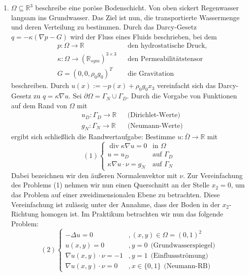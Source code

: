\documentclass[12pt,a4paper]{scrartcl}
\newcommand{\R}{\mathbb{R}}
\DeclareMathOperator{\dive}{div}
\numberwithin{equation}{section}
\begin{document}
\begin{enumerate}[label=(\roman*)]
\item  $ \Omega \subseteq \R^3 $  beschreibe eine poröse Bodenschicht. Von oben sickert Regenwasser langsam ins Grundwasser. Das Ziel ist nun, die transportierte Wassermenge und deren Verteilung zu bestimmen.
\newline Durch das Darcy-Gesetz $ q= -\kappa(\nabla p - G)$ wird der Fluss eines Fluids beschrieben, bei dem 
\begin{align*}& p:\Omega \rightarrow \R &&\text{den hydrostatische Druck,}\\
&  \kappa : \Omega \rightarrow (\R_{sym})^{3\times3}  &&\text{den Permeabilitätstensor}\\
& G = (0,0,\rho_0 g_0)^T &&\text{die Gravitation}
\end{align*} beschreiben. Durch $u(x):=-p(x)+\rho_0 g_0 x_3$ vereinfacht sich das Darcy-Gesetz zu $q=\kappa\nabla u$.
\newline Sei $\partial \Omega = \Gamma_N \cup \Gamma_D$. Durch die Vorgabe von Funktionen auf dem Rand von $\Omega$ mit
\begin{align*}&u_D: \Gamma_D \rightarrow \R &&\text{(Dirichlet-Werte)}\\
& g_N: \Gamma_N \rightarrow \R &&\text{(Neumann-Werte)}
\end{align*} ergibt sich schließlich die Randwertaufgabe: Bestimme $u:\bar{\Omega} \rightarrow \R$ mit
\[(1)\begin{cases}
\dive \kappa \nabla u = 0 &\text{in $\Omega$}\\
u = u_D  &\text{auf $\Gamma_D$}\\
\kappa \nabla u \cdot \nu = g_N &\text{auf $\Gamma_N$}
\end{cases}
\]
Dabei bezeichnen wir den äußeren Normalenvektor mit $\nu$.
\newline Zur Vereinfachung des Problems (1) nehmen wir nun einen Querschnitt an der Stelle $x_2 = 0$, um das Problem auf einer zweidimensionalen Ebene zu betrachten. Diese Vereinfachung ist zulässig unter der Annahme, dass der Boden in der $x_2$-Richtung homogen ist. 
\newline Im Praktikum betrachten wir nun das folgende Problem:
\[(2)\begin{cases}
- \Delta u = 0 &,(x,y) \in \Omega = (0,1)^2\\
u(x,y) =0   &,y=0 \ \ \text{(Grundwasserspiegel)}\\
\nabla u(x,y) \cdot \nu = -1 &,y=1 \ \ \text{(Einflussströmung)}\\
\nabla u(x,y) \cdot \nu = 0 &,x\in \{0,1\}  \ \ \text{(Neumann-RB)}
\end{cases}
\]


\end{enumerate}
\end{document}
